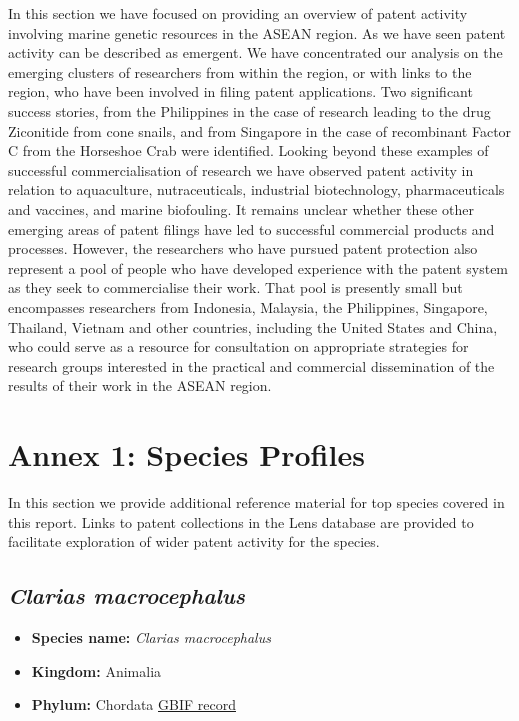 \documentclass[]{book}
\providecommand{\tightlist}{%
  \setlength{\itemsep}{0pt}\setlength{\parskip}{0pt}}
\theoremstyle{definition}
\theoremstyle{definition}
\theoremstyle{definition}
\theoremstyle{remark}
\begin{document}
In this section we have focused on providing an overview of patent
activity involving marine genetic resources in the ASEAN region. As we
have seen patent activity can be described as emergent. We have
concentrated our analysis on the emerging clusters of researchers from
within the region, or with links to the region, who have been involved
in filing patent applications. Two significant success stories, from the
Philippines in the case of research leading to the drug Ziconitide from
cone snails, and from Singapore in the case of recombinant Factor C from
the Horseshoe Crab were identified. Looking beyond these examples of
successful commercialisation of research we have observed patent
activity in relation to aquaculture, nutraceuticals, industrial
biotechnology, pharmaceuticals and vaccines, and marine biofouling. It
remains unclear whether these other emerging areas of patent filings
have led to successful commercial products and processes. However, the
researchers who have pursued patent protection also represent a pool of
people who have developed experience with the patent system as they seek
to commercialise their work. That pool is presently small but
encompasses researchers from Indonesia, Malaysia, the Philippines,
Singapore, Thailand, Vietnam and other countries, including the United
States and China, who could serve as a resource for consultation on
appropriate strategies for research groups interested in the practical
and commercial dissemination of the results of their work in the ASEAN
region.

\hypertarget{species}{%
\chapter{Annex 1: Species Profiles}\label{species}}

In this section we provide additional reference material for top species
covered in this report. Links to patent collections in the Lens database
are provided to facilitate exploration of wider patent activity for the
species.

\hypertarget{clarias-macrocephalus}{%
\section{\texorpdfstring{\emph{Clarias
macrocephalus}}{Clarias macrocephalus}}\label{clarias-macrocephalus}}

\begin{itemize}
\tightlist
\item
  \textbf{Species name:} \emph{Clarias macrocephalus}
\item
  \textbf{Kingdom:} Animalia\\
\item
  \textbf{Phylum:} Chordata
  \href{https://www.gbif.org/species/5202728}{GBIF record}
\end{itemize}
\end{document}
